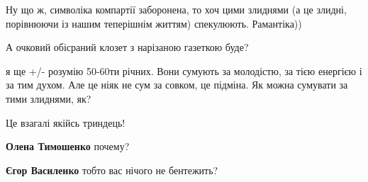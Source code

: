 \begin{itemize}
 
Ну що ж, символіка компартії заборонена, то хоч цими злиднями (а це злидні,
порівнюючи із нашим теперішнім життям) спекулюють. Рамантіка))

 
А очковий обісраний клозет з нарізаною газеткою буде?

 

я ще +/- розумію 50-60ти річних. Вони сумують за молодістю, за тією енергією і
за тим духом. Але це ніяк не сум за совком, це підміна. Як можна сумувати за
тими злиднями, як?


 
Це взагалі якійсь триндець!

\begin{itemize}
 
\textbf{Олена Тимошенко} почему?

 
\textbf{Єгор Василенко} тобто вас нічого не бентежить?


\end{itemize}
\end{itemize}
